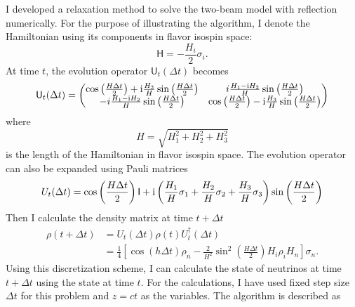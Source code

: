 I developed a relaxation method to solve the two-beam model with reflection numerically. For the purpose of illustrating the algorithm, I denote the Hamiltonian using its components in flavor isospin space:
\begin{equation}
\mathsf H = -\frac{H_i}{2}\sigma_i.
\end{equation}
At time $t$, the evolution operator $\mathsf U_t(\Delta t)$ becomes
\begin{equation}
    \mathsf U_t(\Delta t) = \begin{pmatrix}
        \cos\left( \frac{H \Delta t}{2} \right) + \mathrm{i} \frac{H_3}{H} \sin \left( \frac{H \Delta t}{2} \right) &  i \frac{H_1 - \mathrm{i} H_2}{H} \sin \left( \frac{H \Delta t}{2} \right)  \\
        - i \frac{ H_1 -\mathrm{i} H_2}{H} \sin \left( \frac{H \Delta t}{2} \right) & \cos\left( \frac{H \Delta t}{2} \right) - \mathrm{i} \frac{H_3}{H} \sin \left( \frac{H \Delta t}{2} \right)
    \end{pmatrix}
\end{equation}
where
\begin{equation}
    H = \sqrt{ H_1^2 + H_2^2 + H_3^2 }
\end{equation} 
is the length of the Hamiltonian in flavor isospin space. The evolution operator can also be expanded using Pauli matrices
\begin{align}
    U_t(\Delta t) = \cos \left( \frac{H \Delta t}{2} \right) \mathsf I + \mathrm{i} \left( \frac{H_1}{H}  \sigma_1 + \frac{H_2}{H} \sigma_2 + \frac{H_3}{H} \sigma_3 \right) \sin \left( \frac{H \Delta t}{2} \right) 
\end{align}
Then I calculate the density matrix at time $t+\Delta t$
\begin{align}
    \rho ( t + \Delta t ) &= U_t (\Delta t) \rho(t)U_t^\dagger (\Delta t) \\
    & = \frac{1}{4} \left[  \cos( h \Delta t) \rho_n - \frac{2}{H^2} \sin^2 \left( \frac{H \Delta t}{2} \right)  H_i \rho_i H_n  \right] \sigma_n.
\end{align}
Using this discretization scheme, I can calculate the state of neutrinos at time $t+\Delta t$ using the state at time $t$. For the calculations, I have used fixed step size $\Delta t$ for this problem and $z=c t$ as the variables. The algorithm is described as
